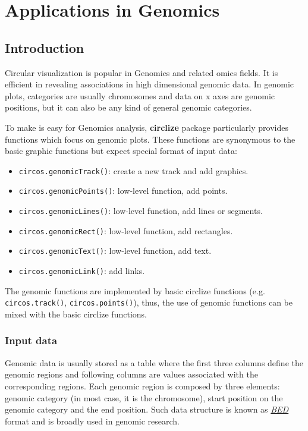 \documentclass[]{book}
\providecommand{\tightlist}{%
  \setlength{\itemsep}{0pt}\setlength{\parskip}{0pt}}
\begin{document}
\part{Applications in
Genomics}\label{part-applications-in-genomics}

\chapter{Introduction}\label{genomic-introduction}

Circular visualization is popular in Genomics and related omics fields.
It is efficient in revealing associations in high dimensional genomic
data. In genomic plots, categories are usually chromosomes and data on x
axes are genomic positions, but it can also be any kind of general
genomic categories.

To make is easy for Genomics analysis, \textbf{circlize} package
particularly provides functions which focus on genomic plots. These
functions are synonymous to the basic graphic functions but expect
special format of input data:

\begin{itemize}
\tightlist
\item
  \texttt{circos.genomicTrack()}: create a new track and add graphics.
\item
  \texttt{circos.genomicPoints()}: low-level function, add points.
\item
  \texttt{circos.genomicLines()}: low-level function, add lines or
  segments.
\item
  \texttt{circos.genomicRect()}: low-level function, add rectangles.
\item
  \texttt{circos.genomicText()}: low-level function, add text.
\item
  \texttt{circos.genomicLink()}: add links.
\end{itemize}

The genomic functions are implemented by basic circlize functions (e.g.
\texttt{circos.track()}, \texttt{circos.points()}), thus, the use of
genomic functions can be mixed with the basic circlize functions.

\section{Input data}\label{input-data}

Genomic data is usually stored as a table where the first three columns
define the genomic regions and following columns are values associated
with the corresponding regions. Each genomic region is composed by three
elements: genomic category (in most case, it is the chromosome), start
position on the genomic category and the end position. Such data
structure is known as
\href{https://genome.ucsc.edu/FAQ/FAQformat\#format1}{\emph{BED}} format
and is broadly used in genomic research.
\end{document}
